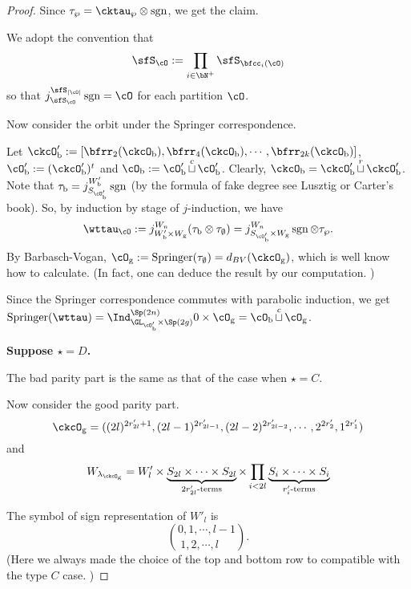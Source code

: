 \documentclass[12pt,a4paper]{amsart}
\def\abs#1{\left|{#1}\right|}
\newcommand{\sgn}{\operatorname{sgn}}
\numberwithin{equation}{section}
\theoremstyle{remark}
\def\lamckg{\lambda_{\ckcO_{\mathrm g}}}
\def\cuprow{{\stackrel{r}{\sqcup}}}
\def\cupcol{{\stackrel{c}{\sqcup}}}
\def\Spr{\mathrm{Springer}}
\def\cuprow{{\,\stackrel{r}{\sqcup}\,}}
\def\cupcol{{\,\stackrel{c}{\sqcup}\,}}
\begin{document}
\begin{proof}
{{      Since $\tau_{\wp} = \cktau_{\wp}\otimes \sgn$, we get the claim.

      We adopt the convention that
      \[
        \sfS_{\cO} := \prod_{i\in \bN^{+}}\sfS_{\bfcc_{i}(\cO)}
      \]
      so that $j_{\sfS_{\cO}}^{\sfS_{\abs{\cO}}}\sgn = \cO$ for each partition
      $\cO$.

      Now consider the orbit under the Springer correspondence.

      Let
      $\ckcO'_{\mathrm b}: = [\bfrr_{2}(\ckcO_{\mathrm b}), \bfrr_{4}(\ckcO_{\mathrm b}),\cdots, \bfrr_{2k}(\ckcO_{\mathrm b})]$,
      $\cO'_{\mathrm b}:=(\ckcO'_{\mathrm b})^{t}$ and $\cO_{\mathrm b}:=\cO'_{\mathrm b}\cupcol \cO'_{\mathrm b}$.
      Clearly, $\ckcO_{\mathrm b} = \ckcO'_{\mathrm b}\cuprow \ckcO'_{\mathrm b}$. Note that
      $\tau_{\mathrm b} = j_{S_{\cO'_{\mathrm b}}}^{W'_{\mathrm b}} \sgn$ (by the formula of fake degree
      see Lusztig or Carter's book). So, by induction by stage of $j$-induction,
      we have
      \[
        \wttau_{\cO}:= j_{W'_{\mathrm b}\times W_{\mathrm g}}^{W_{n}} (\tau_{\mathrm b}\otimes \tau_{\emptyset}) = j_{S_{\cO'_{\mathrm b}}\times W_{\mathrm g}}^{W_{n}} \sgn\otimes \tau_{\wp}.
      \]
      By Barbasch-Vogan, $\cO_{\mathrm g}:=\Spr(\tau_{\emptyset}) = d_{BV}(\ckcO_{\mathrm g})$,
      which is well know how to calculate. (In fact, one can deduce the result
      by our computation. )

      Since the Springer correspondence commutes with parabolic induction, we
      get
      $\Spr(\wttau) = \Ind_{\GL_{\cO'_{\mathrm b}}\times \Sp(2g)}^{\Sp(2n)} 0\times \cO_{\mathrm g} = \cO_{\mathrm b}\cupcol \cO_{\mathrm g}$.


      \medskip

      {\bf Suppose $\star=D$.}

      The bad parity part is the same as that of the case when $\star = C$.

      Now consider the good parity part.
      \[
        \ckcO_{\mathrm g} = ((2l)^{2r'_{2l}+1}, (2l-1)^{2r'_{2l-1}}, (2l-2)^{2r'_{2l-2}}, \cdots, 2^{2r'_{2}}, 1^{2r'_{1}} )
      \]
      and
      \[
        W_{\lamckg} = W'_{l}\times \underbrace{S_{2l}\times \cdots \times S_{2l}}_{2r'_{2l}\text{-terms}} \times \prod_{i<2l} \underbrace{S_{i}\times \cdots\times S_{i}}_{r'_{i}\text{-terms}}
      \]

      The symbol of sign representation of $W'_{l}$ is
      \[
        \binom{0,1, \cdots, l-1}{1,2, \cdots, l\phantom{-1}}.
      \]
      (Here we always made the choice of the top and bottom row to compatible
      with the type $C$ case. )

}}
\end{proof}
\end{document}
